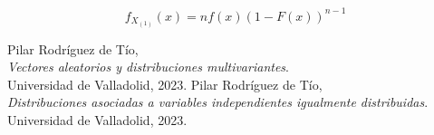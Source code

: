 \documentclass{article}
\begin{document}
\[ f_{X_{(1)}}(x)=nf(x)(1 - F(x))^{n-1} \]





\begin{thebibliography}{9}
    Pilar Rodríguez de Tío, \\ \textit{Vectores aleatorios y distribuciones multivariantes}. \\ Universidad de Valladolid, 2023.
    Pilar Rodríguez de Tío, \\ \textit{Distribuciones asociadas a variables independientes igualmente distribuidas}. \\ Universidad de Valladolid, 2023.
\end{thebibliography}

\end{document}
